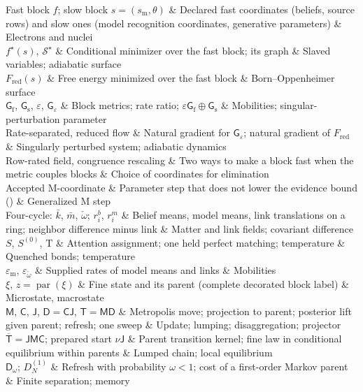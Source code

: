 \begin{decoder}
Fast block $f$; slow block $s=(s_{\mathrm m},\theta)$ & Declared fast coordinates (beliefs, source rows) and slow ones (model recognition coordinates, generative parameters) & Electrons and nuclei\\
$f^\star(s)$, $\mathcal S^\star$ & Conditional minimizer over the fast block; its graph & Slaved variables; adiabatic surface\\
$F_{\mathrm{red}}(s)$ & Free energy minimized over the fast block & Born--Oppenheimer surface\\
$\mathsf G_{\mathrm f}$, $\mathsf G_{\mathrm s}$, $\varepsilon$, $\mathsf G_\varepsilon$ & Block metrics; rate ratio; $\varepsilon\mathsf G_{\mathrm f}\oplus\mathsf G_{\mathrm s}$ & Mobilities; singular-perturbation parameter\\
Rate-separated, reduced flow & Natural gradient for $\mathsf G_\varepsilon$; natural gradient of $F_{\mathrm{red}}$ & Singularly perturbed system; adiabatic dynamics\\
Row-rated field, congruence rescaling & Two ways to make a block fast when the metric couples blocks & Choice of coordinates for elimination\\
Accepted M-coordinate & Parameter step that does not lower the evidence bound () & Generalized M step\\
Four-cycle: $\bar k$, $\bar m$, $\check\omega$; $r^b_i$, $r^m_i$ & Belief means, model means, link translations on a ring; neighbor difference minus link & Matter and link fields; covariant difference\\
$S$, $S^{(0)}$, $\mathrm T$ & Attention assignment; one held perfect matching; temperature & Quenched bonds; temperature\\
$\varepsilon_{\mathrm m}$, $\varepsilon_{\check\omega}$ & Supplied rates of model means and links & Mobilities\\
$\xi$, $z=\operatorname{par}(\xi)$ & Fine state and its parent (complete decorated block label) & Microstate, macrostate\\
$\mathsf M$, $\mathsf C$, $\mathsf J$, $\mathsf D=\mathsf C\mathsf J$, $\mathsf T=\mathsf M\mathsf D$ & Metropolis move; projection to parent; posterior lift given parent; refresh; one sweep & Update; lumping; disaggregation; projector\\
$\overline{\mathsf T}=\mathsf J\mathsf M\mathsf C$; prepared start $\nu\mathsf J$ & Parent transition kernel; fine law in conditional equilibrium within parents & Lumped chain; local equilibrium\\
$\mathsf D_\omega$; $D^{(1)}_N$ & Refresh with probability $\omega<1$; cost of a first-order Markov parent & Finite separation; memory\\
\end{decoder}

